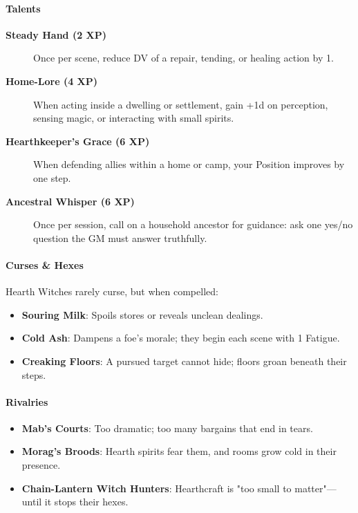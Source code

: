 \documentclass[11pt]{book}
\begin{document}
\paragraph{Talents}
\begin{description}
    \item[\textbf{Steady Hand (2 XP)}]  
    Once per scene, reduce DV of a repair, tending, or healing action by 1.

    \item[\textbf{Home-Lore (4 XP)}]  
    When acting inside a dwelling or settlement, gain +1d on perception, sensing magic, or interacting with small spirits.

    \item[\textbf{Hearthkeeper's Grace (6 XP)}]  
    When defending allies within a home or camp, your Position improves by one step.

    \item[\textbf{Ancestral Whisper (6 XP)}]  
    Once per session, call on a household ancestor for guidance: ask one yes/no question the GM must answer truthfully.
\end{description}

\paragraph{Curses \& Hexes}
Hearth Witches rarely curse, but when compelled:
\begin{itemize}
    \item \textbf{Souring Milk}: Spoils stores or reveals unclean dealings.
    \item \textbf{Cold Ash}: Dampens a foe's morale; they begin each scene with 1 Fatigue.
    \item \textbf{Creaking Floors}: A pursued target cannot hide; floors groan beneath their steps.
\end{itemize}

\paragraph{Rivalries}
\begin{itemize}
    \item \textbf{Mab's Courts}: Too dramatic; too many bargains that end in tears.
    \item \textbf{Morag's Broods}: Hearth spirits fear them, and rooms grow cold in their presence.
    \item \textbf{Chain-Lantern Witch Hunters}: Hearthcraft is "too small to matter"---until it stops their hexes.
\end{itemize}
\end{document}
